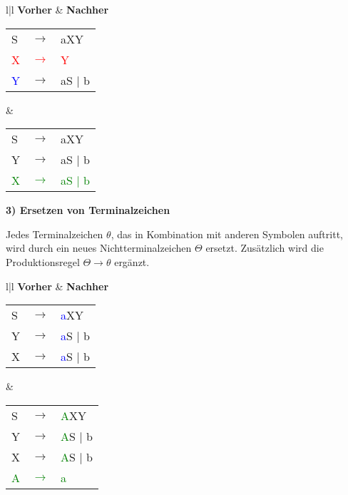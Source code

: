 	\begin{tabular}{l|l}
		\textbf{Vorher} & \textbf{Nachher} \\
		\hline
		\begin{tabular}{lcl}
		S  & $\rightarrow$ & aXY                \\
		\textcolor{red}{X} & \textcolor{red}{$\rightarrow$} & \textcolor{red}{Y} \\ 
		\textcolor{blue}{Y}  & $\rightarrow$ & aS $\mid$ b         \\ 
		\end{tabular} &
		\begin{tabular}{lcl}
		S  & $\rightarrow$ & aXY                 \\
		Y  & $\rightarrow$ & aS $\mid$ b         \\
		\textcolor{green}{X}  & \textcolor{green}{$\rightarrow$} & \textcolor{green}{aS $\mid$ b}         \\ 
		\end{tabular}
	\end{tabular}
	

	\textbf{3) Ersetzen von Terminalzeichen}

	Jedes Terminalzeichen $\theta$, das in Kombination mit anderen Symbolen auftritt, wird durch ein neues Nichtterminalzeichen $\Theta$ ersetzt. Zusätzlich wird die Produktionsregel $\Theta \rightarrow \theta$ ergänzt.

	\begin{tabular}{l|l}
		\textbf{Vorher} & \textbf{Nachher} \\
		\hline
		\begin{tabular}{lcl}
			S  & $\rightarrow$ & \textcolor{blue}{a}XY                 \\
			Y  & $\rightarrow$ & \textcolor{blue}{a}S $\mid$ b         \\
			X  & $\rightarrow$ & \textcolor{blue}{a}S $\mid$ b         \\ 
		\end{tabular} &
		\begin{tabular}{lcl}
			S  & $\rightarrow$ & \textcolor{green}{A}XY                 \\
			Y  & $\rightarrow$ & \textcolor{green}{A}S $\mid$ b         \\
			X  & $\rightarrow$ & \textcolor{green}{A}S $\mid$ b         \\ 
			\textcolor{green}{A}  & \textcolor{green}{$\rightarrow$} & \textcolor{green}{a} \\
		\end{tabular}
	\end{tabular}
	
